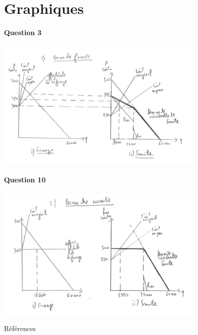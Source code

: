    \section{Graphiques}
   \frame{\sectionpage}
  \begin{frame}[allowframebreaks]{\insertsection}
   \framesubtitle{Question 3}
   \begin{center}
   \includegraphics[width=4in]{figq3.png}
   \end{center}
   \end{frame}
   
   \begin{frame}[allowframebreaks]{\insertsection}
   \framesubtitle{Question 10}
   \begin{center}
   \includegraphics[width=4in]{figq10.png}
   \end{center}
   \end{frame}
   
\begin{frame}[allowframebreaks]{Références}


\end{frame}


